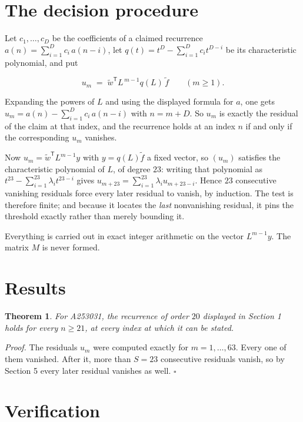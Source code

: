 \documentclass[11pt]{article}
\newtheorem{theorem}{Theorem}
\theoremstyle{definition}
\begin{document}
\section{The decision procedure}

Let $c_1,\dots,c_D$ be the coefficients of a claimed recurrence $a(n) = \sum_{i=1}^{D} c_i\,a(n-i)$, let $q(t) = t^{D} - \sum_{i=1}^{D} c_i t^{D-i}$ be its characteristic polynomial, and put

\[u_m \;=\; \tilde w^{\mathsf T} L^{\,m-1} q(L)\,\tilde f \qquad (m \ge 1).\]

Expanding the powers of $L$ and using the displayed formula for $a$, one gets $u_m = a(n) - \sum_{i=1}^{D} c_i\,a(n-i)$ with $n = m + D$. So $u_m$ is exactly the residual of the claim at that index, and the recurrence holds at an index $n$ if and only if the corresponding $u_m$ vanishes.

Now $u_m = \tilde w^{\mathsf T} L^{m-1} y$ with $y = q(L)\tilde f$ a fixed vector, so $(u_m)$ satisfies the characteristic polynomial of $L$, of degree $23$: writing that polynomial as $t^{23} - \sum_{i=1}^{23} \lambda_i t^{23-i}$ gives $u_{m+23} = \sum_{i=1}^{23} \lambda_i u_{m+23-i}$. Hence $23$ consecutive vanishing residuals force every later residual to vanish, by induction. The test is therefore finite; and because it locates the {\itshape last} nonvanishing residual, it pins the threshold exactly rather than merely bounding it.

Everything is carried out in exact integer arithmetic on the vector $L^{m-1}y$. The matrix $M$ is never formed.

\section{Results}

\begin{theorem} For A253031, the recurrence of order $20$ displayed in Section 1 holds for every $n \ge 21$, at every index at which it can be stated.\end{theorem}

{\itshape Proof.} The residuals $u_m$ were computed exactly for $m = 1,\dots,63$. Every one of them vanished. After it, more than $S = 23$ consecutive residuals vanish, so by Section 5 every later residual vanishes as well. $\square$

\section{Verification}
\end{document}
